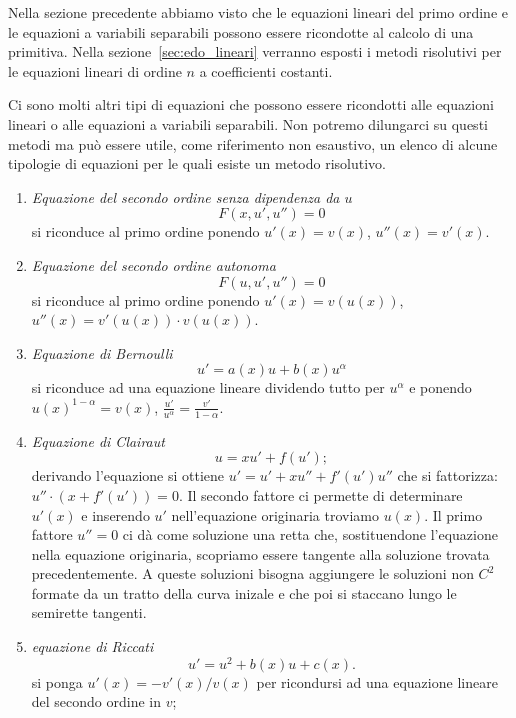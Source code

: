 Nella sezione precedente abbiamo visto che le equazioni lineari del primo ordine
e le equazioni
a variabili separabili possono essere ricondotte al calcolo di una primitiva.
Nella sezione~\ref{sec:edo_lineari} verranno esposti i metodi risolutivi per le
equazioni lineari di ordine $n$ a coefficienti costanti.

Ci sono molti altri tipi di equazioni che possono essere ricondotti
alle equazioni lineari o alle equazioni a variabili separabili.
Non potremo dilungarci su questi metodi ma può essere utile,
come riferimento non esaustivo,
un elenco di alcune tipologie di equazioni per le quali esiste un metodo
risolutivo.

\begin{enumerate}
\item \emph{Equazione del secondo ordine senza dipendenza da $u$}
\[
  F(x, u', u'') = 0
\]
si riconduce al primo ordine ponendo $u'(x) = v(x)$, $u''(x) = v'(x)$.

\item \emph{Equazione del secondo ordine autonoma}
\[
  F(u, u', u'') = 0
\]
si riconduce al primo ordine
ponendo $u'(x) = v(u(x))$,
$u''(x) = v'(u(x))\cdot v(u(x))$.

\item \emph{Equazione di Bernoulli}
%
%
\[
  u' = a(x) u + b(x) u^\alpha
\]
si riconduce ad una equazione lineare dividendo tutto per $u^\alpha$
e ponendo $u(x)^{1-\alpha} = v(x)$, $\frac{u'}{u^\alpha} = \frac{v'}{1-\alpha}$.

\item \emph{Equazione di Clairaut}
%
%
\[
  u = x u' + f(u');
\]
derivando l'equazione si ottiene $ u' = u' + xu'' + f'(u')u''$
che si fattorizza: $u''\cdot(x+f'(u'))=0$. 
Il secondo fattore ci permette di determinare $u'(x)$ e inserendo $u'$
nell'equazione originaria troviamo $u(x)$. 
Il primo fattore $u''=0$ ci dà come soluzione una retta che, sostituendone 
l'equazione nella equazione originaria, scopriamo essere tangente 
alla soluzione trovata precedentemente.
A queste soluzioni bisogna aggiungere le soluzioni non $C^2$ formate da un tratto
della curva inizale e che poi si staccano lungo le semirette tangenti.

\item \emph{equazione di Riccati}
%
%
\[
  u' = u^2 + b(x) u + c(x).
\]
si ponga $u'(x) = -v'(x)/v(x)$ per ricondursi ad
una equazione lineare del secondo ordine in $v$;
\end{enumerate}

